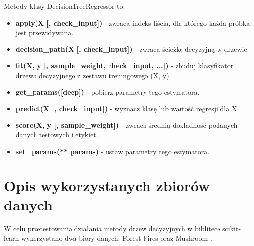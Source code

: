 \documentclass[10pt,a4paper]{article}
\begin{document}
Metody klasy DecisionTreeRegressor to:
\begin{itemize}
	\item \textbf{apply(X [, check\_input])} - zwraca indeks liścia, dla którego każda próbka jest przewidywana.
	\item \textbf{decision\_path(X [, check\_input])} - zwraca ścieżkę decyzyjną w drzewie
	\item \textbf{fit(X, y [, sample\_weight, check\_input, ...])} - zbuduj klasyfikator drzewa decyzyjnego z zestawu treningowego (X, y).
	\item \textbf{get\_params([deep])} - pobierz parametry tego estymatora.
	\item \textbf{predict(X [, check\_input])} - wyznacz klasę lub wartość regresji dla X.
	\item \textbf{score(X, y [, sample\_weight])} - zwraca średnią dokładność podanych danych testowych i etykiet.
	\item \textbf{set\_params(** params)} - ustaw parametry tego estymatora.
\end{itemize}

\section{Opis wykorzystanych zbiorów danych}
W celu przetestowania działania metody drzew decyzyjnych w biblitece scikit-learn wykorzystano dwa biory danych: Forest Fires \cite{ForestFiresDS} oraz Mushroom \cite{MushroomDS}.
\end{document}
